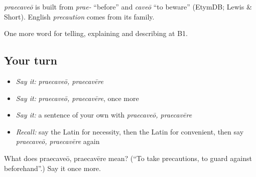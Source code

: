 \begin{cousinweb}
\emph{praecaveō} is built from \emph{prae-} \textquotedblleft{}before\textquotedblright{} and \emph{caveō} \textquotedblleft{}to beware\textquotedblright{} (EtymDB; Lewis \& Short). English \emph{precaution} comes from its family.
\end{cousinweb}

\begin{grammarlens}[title={What you've built}]
One more word for telling, explaining and describing at B1.
\end{grammarlens}

\subsection*{Your turn}
\begin{itemize}
\raggedright
  \item \emph{Say it:} \emph{praecaveō, praecavēre}
  \item \emph{Say it:} \emph{praecaveō, praecavēre}, once more
  \item \emph{Say it:} a sentence of your own with \emph{praecaveō, praecavēre}
  \item \emph{Recall:} say the Latin for necessity, then the Latin for convenient, then say \emph{praecaveō, praecavēre} again
\end{itemize}

\begin{tcolorbox}[breakable,colback=teal!4,colframe=teal!35!black,title={Before you move on}]
What does praecaveō, praecavēre mean? (\textquotedblleft{}To take precautions, to guard against beforehand\textquotedblright{}.) Say it once more.
\end{tcolorbox}
